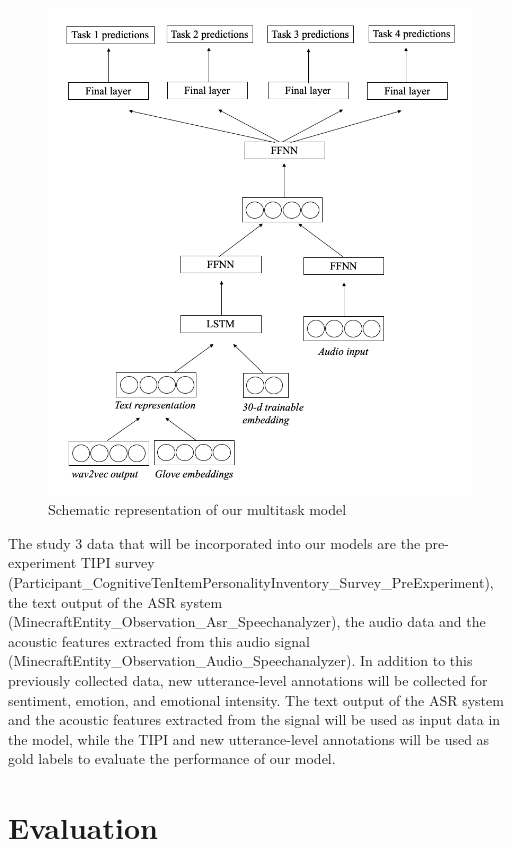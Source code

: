 \begin{figure}
    \centering
    \includegraphics[width=\textwidth]{images/sentiment_schematics_study3.png}
    \caption{Schematic representation of our multitask model}
    \label{fig:sentiment_model_schematics}
\end{figure}

The study 3 data that will be incorporated into our models are the
pre-experiment TIPI survey
(Participant\_CognitiveTenItemPersonalityInventory\_Survey\_PreExperiment),
the text output of the ASR system
(MinecraftEntity\_Observation\_Asr\_Speechanalyzer), the audio data and the
acoustic features extracted from this audio signal
(MinecraftEntity\_Observation\_Audio\_Speechanalyzer). In addition to this
previously collected data, new utterance-level annotations will be collected
for sentiment, emotion, and emotional intensity. The text output of the ASR
system and the acoustic features extracted from the signal will be used as
input data in the model, while the TIPI and new utterance-level annotations
will be used as gold labels to evaluate the performance of our model. 


\section{Evaluation}

